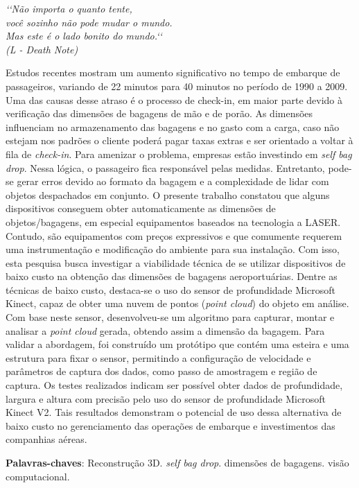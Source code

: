 \begin{epigrafe}
    \vspace*{\fill}
    \begin{flushright}
        \textit{‘‘Não importa o quanto tente, \\ você sozinho não pode mudar o mundo.\\  Mas este é o lado bonito do mundo.‘‘\\
        (L - Death Note)}
    \end{flushright}
\end{epigrafe}



\begin{resumo}
Estudos recentes mostram um aumento significativo no tempo de embarque de passageiros, variando de 22 minutos para 40 minutos no período de 1990 a 2009. Uma das causas desse atraso é o processo de check-in, em maior parte devido à verificação das dimensões de bagagens de mão e de porão. As dimensões influenciam no armazenamento das bagagens e no gasto com a carga, caso não estejam nos padrões o cliente poderá pagar taxas extras e ser orientado a voltar à fila de \textit{check-in}. 
Para amenizar o problema, empresas estão investindo em \textit{self bag drop}. Nessa lógica, o passageiro fica responsável pelas medidas. Entretanto, pode-se gerar erros devido ao formato da bagagem e a complexidade de lidar com objetos despachados em conjunto. O presente trabalho constatou que alguns dispositivos conseguem obter automaticamente as dimensões de objetos/bagagens, em especial equipamentos baseados na tecnologia a LASER. Contudo, são equipamentos com preços expressivos e que comumente requerem uma instrumentação e modificação do ambiente para sua instalação. Com isso, esta pesquisa busca investigar a viabilidade técnica de se utilizar dispositivos de baixo custo na obtenção das dimensões de bagagens aeroportuárias.
Dentre as técnicas de baixo custo, destaca-se o uso do sensor de profundidade Microsoft Kinect, capaz de obter uma nuvem de pontos (\textit{point cloud}) do objeto em análise. Com base neste sensor, desenvolveu-se um algoritmo para capturar, montar e analisar a \textit{point cloud} gerada, obtendo assim a dimensão da bagagem. 
Para validar a abordagem, foi construído um protótipo que contém uma esteira e uma estrutura para fixar o sensor, permitindo a configuração de velocidade e parâmetros de captura dos dados, como passo de amostragem e região de captura. 
Os testes realizados indicam ser possível obter dados de profundidade, largura e altura com precisão pelo uso do sensor de profundidade Microsoft Kinect V2. Tais resultados demonstram o potencial de uso dessa alternativa de baixo custo no gerenciamento das operações de embarque e investimentos das companhias aéreas.


    \vspace{\onelineskip}
    \noindent
    \textbf{Palavras-chaves}: Reconstrução 3D. \textit{self bag drop}. dimensões de bagagens. visão computacional.
\end{resumo}




